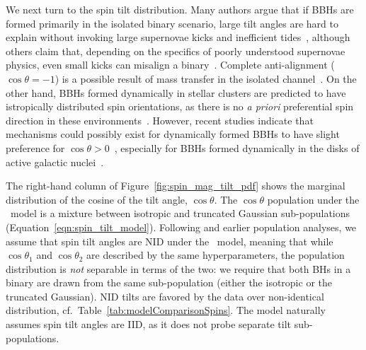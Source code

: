 We next turn to the spin tilt distribution. 
Many authors argue that if \acp{BBH} are formed primarily in the isolated binary scenario, large tilt angles are hard to explain without invoking large supernovae kicks and inefficient tides~\citep{Kalogera:1999tq,Gerosa:2018wbw, Steinle:2020xej,Wysocki:2017isg,Stevenson:2022hmi,Callister:2020vyz}, although others claim that, depending on the specifics of poorly understood supernovae physics, even small kicks can misalign a binary~\citep{Baibhav:2024rkn,Tauris:2022ggv}.
Complete anti-alignment ($\cos\theta = -1$) is a possible result of mass transfer in the isolated channel~\citep{Stegmann:2020kgb}. 
On the other hand, \acp{BBH} formed dynamically in stellar clusters are predicted to have istropically distributed spin orientations, as there is no \textit{a priori} preferential spin direction in these environments~\citep{Rodriguez:2015oxa,Rodriguez:2016kxx,Rodriguez:2017pec,Farr:2017uvj}.
However, recent studies indicate that mechanisms could possibly exist for dynamically formed \acp{BBH} to have slight preference for $\cos\theta>0$~\citep{Trani:2021lcv,Banerjee:2023ycw,Kiroglu:2025bbp}, especially for \acp{BBH} formed dynamically in the disks of active galactic nuclei~\citep{Wang:2021yjf,McKernan:2021nwk}.

The right-hand column of Figure~\ref{fig:spin_mag_tilt_pdf} shows the marginal distribution of the cosine of the tilt angle, $\cos\theta$.
The $\cos\theta$ population under the ~model is a mixture between isotropic and truncated Gaussian sub-populations (Equation~\ref{eqn:spin_tilt_model}).
Following \gwtcthree and earlier population analyses, we assume that spin tilt angles are \ac{NID} under the ~model, meaning that while $\cos\theta_1$ and $\cos\theta_2$ are described by the same hyperparameters, the population distribution is \textit{not} separable in terms of the two: we require that both \acp{BH} in a binary are drawn from the same sub-population (either the isotropic or the truncated Gaussian).
\ac{NID} tilts are favored by the data over non-identical distribution, cf.~Table~\ref{tab:modelComparisonSpins}.
The \BSpline model naturally assumes spin tilt angles are \ac{IID}, as it does not probe separate tilt sub-populations.

